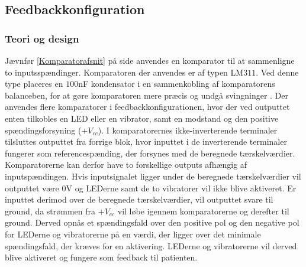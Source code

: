 \subsection{Feedbackkonfiguration}
\subsubsection{Teori og design} \label{Afs_Komparator}
Jævnfør \ref{Komparatorafsnit} på side \pageref{Komparatorafsnit} anvendes en komparator til at sammenligne to inputsspændinger. Komparatoren der anvendes er af typen LM$311$. Ved denne type placeres en $100$nF kondensator i en sammenkobling af komparatorens balanceben, for at gøre komparatoren mere præcis og undgå svingninger \cite{Instruments2015}. Der anvendes flere komparatorer i feedbackkonfigurationen, hvor der ved outputtet enten tilkobles en LED eller en vibrator, samt en modstand og den positive spændingsforsyning ($+V_{cc}$). I komparatorernes ikke-inverterende terminaler tilsluttes outputtet fra forrige blok, hvor inputtet i de inverterende terminaler fungerer som referencespænding, der forsynes med de beregnede tærskelværdier. Komparatorerne kan derfor have to forskellige outputs afhængig af inputspændingen. Hvis inputsignalet ligger under de beregnede tærskelværdier vil outputtet være $0$V og LEDerne samt de to vibratorer vil ikke blive aktiveret. Er inputtet derimod over de beregnede tærskelværdier, vil outputtet svare til ground, da strømmen fra $+V_{cc}$ vil løbe igennem komparatorerne og derefter til ground. Derved opnås et spændingsfald over den positive pol  og den negative pol  for LEDerne og vibratorerne på en værdi, der ligger over det minimale spændingsfald, der kræves for en aktivering. LEDerne og vibratorerne vil derved blive aktiveret og fungere som feedback til patienten. \\

